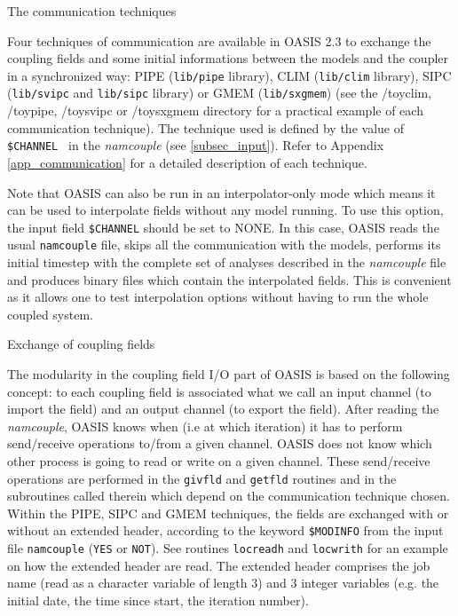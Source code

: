 \begin{subsection}{The communication techniques}
\label{subsec_communication}


Four techniques of communication are available in OASIS 2.3 to 
exchange the coupling fields and some initial informations between the
models and the coupler in a synchronized way: PIPE ({\tt lib/pipe}
library), CLIM ({\tt lib/clim} library), SIPC ({\tt lib/svipc} and
{\tt lib/sipc} library) or GMEM ({\tt lib/sxgmem})
(see the /toyclim, /toypipe, /toysvipc or /toysxgmem directory for a 
practical example of each communication technique).
The technique used is defined by the value of {\tt \$CHANNEL } in the
{\em namcouple} (see \ref{subsec_input}). Refer to Appendix 
\ref{app_communication} for a detailed description of each technique.

Note that OASIS can also be run in an interpolator-only mode which means it
can be used to interpolate fields without any model running.
To use this option, the input field {\tt \$CHANNEL} should be set to NONE.
In this case, OASIS reads the usual {\tt namcouple} file, skips all the
communication with the models, performs its initial timestep with
the complete set of analyses described in the {\em namcouple} file and  
produces binary files which contain the interpolated fields. This is
convenient as it allows one to test interpolation options without
having to run the whole coupled system.

\begin{subsubsection}{Exchange of coupling fields}
\label{subsubsec_coupling}

The modularity in the coupling field I/O part of OASIS is based on 
the following concept: to each coupling field is associated what
we call an input channel (to import the field) and an output channel
(to export the field). After reading the {\em namcouple}, 
OASIS knows when 
(i.e at which iteration) it has to perform send/receive operations 
to/from a given channel. OASIS does not know which other process is 
going to read or write on a given channel. These send/receive
operations are performed in the {\tt givfld} and {\tt getfld} routines
and in the subroutines called therein which depend on the communication
technique chosen.
Within the PIPE, SIPC and GMEM techniques, the fields are exchanged with or 
without an extended header, according
to the keyword {\tt \$MODINFO} from the input file {\tt namcouple} ({\tt YES}
or {\tt NOT}). See routines {\tt locreadh} and {\tt locwrith} for an
example on how the extended header are read. The 
extended header comprises the job name (read as a character variable 
of length 3) and 3 integer variables (e.g. the initial date,
the time since start, the iteration number).  


\end{subsubsection}
\end{subsection}
